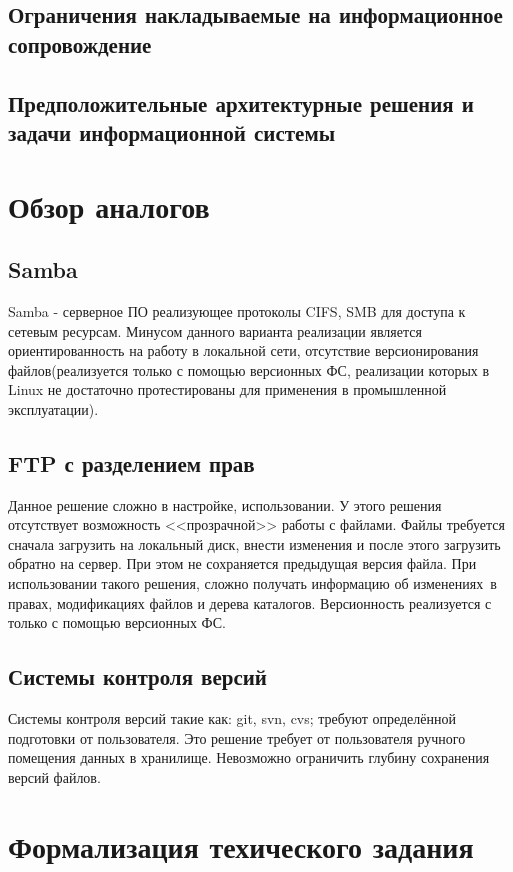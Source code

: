 \documentclass[utf8,usehyperref,12pt]{G7-32}
\begin{document}
\subsection{Ограничения накладываемые на информационное сопровождение}
\subsection{Предположительные архитектурные решения и задачи информационной системы}

\section{Обзор аналогов}
\subsection{Samba}

Samba - серверное ПО реализующее протоколы CIFS, SMB для доступа к сетевым ресурсам. 
Минусом данного варианта реализации является ориентированность на работу в локальной сети, 
отсутствие версионирования файлов(реализуется только с помощью версионных ФС, реализации 
которых в Linux не достаточно протестированы для применения в промышленной эксплуатации).

\subsection{FTP с разделением прав}

Данное решение сложно в настройке, использовании. У этого решения отсутствует возможность 
<<прозрачной>> работы с файлами. Файлы требуется сначала загрузить на локальный диск, внести 
изменения и после этого загрузить обратно на сервер. При этом не сохраняется предыдущая версия 
файла. При использовании такого решения, сложно получать информацию об изменениях~в правах, 
модификациях файлов и дерева каталогов. Версионность реализуется с только с помощью версионных ФС.

\subsection{Системы контроля версий}

Системы контроля версий такие как: git, svn, cvs; 
требуют определённой подготовки от пользователя. Это решение требует от пользователя ручного 
помещения данных в хранилище. Невозможно ограничить глубину сохранения версий файлов.

\section{Формализация техического задания}
\end{document}

